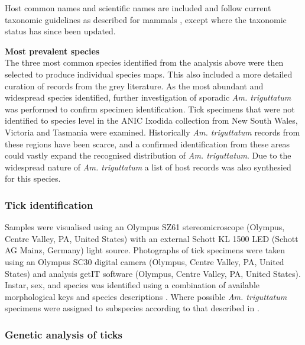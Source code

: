 \documentclass[a4paper, nobind]{templates/ociamthesis}
\begin{document}
Host common names and scientific names are included and follow current taxonomic guidelines as described for mammals \autocite{jacksonTaxonomyAustralianMammals2015}, except where the taxonomic status has since been updated.

\textbf{Most prevalent species}\\
The three most common species identified from the analysis above were then selected to produce individual species maps.
This also included a more detailed curation of records from the grey literature.
As the most abundant and widespread species identified, further investigation of sporadic \emph{Am. triguttatum} was performed to confirm specimen identification.
Tick specimens that were not identified to species level in the ANIC Ixodida collection from New South Wales, Victoria and Tasmania were examined.
Historically \emph{Am. triguttatum} records from these regions have been scarce, and a confirmed identification from these areas could vastly expand the recognised distribution of \emph{Am. triguttatum}.
Due to the widespread nature of \emph{Am. triguttatum} a list of host records was also synthesied for this species.

\hypertarget{tick-identification}{%
\subsubsection{Tick identification}\label{tick-identification}}

Samples were visualised using an Olympus SZ61 stereomicroscope (Olympus, Centre Valley, PA, United States) with an external Schott KL 1500 LED (Schott AG Mainz, Germany) light source.
Photographs of tick specimens were taken using an Olympus SC30 digital camera (Olympus, Centre Valley, PA, United States) and analysis getIT software (Olympus, Centre Valley, PA, United States).
Instar, sex, and species was identified using a combination of available morphological keys and species descriptions \autocite{robertsAustralianTicks1970,jacksonMorphologicalComparisonAdult2002,laanObservationsBiologyDistribution2011,barkerTicksAustraliaSpecies2014,kwakPhylogeneticAnalysisAustralian2017}.
Where possible \emph{Am. triguttatum} specimens were assigned to subspecies according to that described in \textcite{robertsStatusMorphologicallyDivergent1962}.

\hypertarget{genetic-analysis-of-ticks}{%
\subsubsection{Genetic analysis of ticks}\label{genetic-analysis-of-ticks}}
\end{document}
